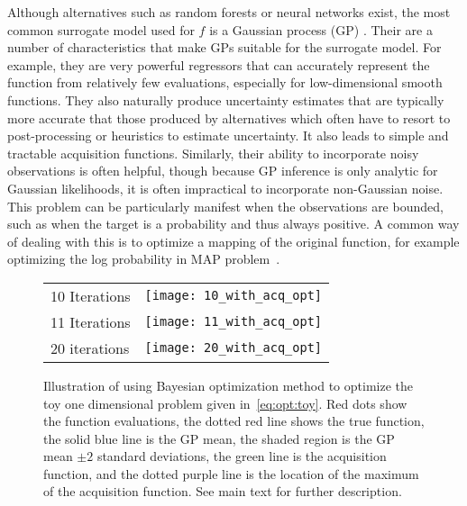 Although alternatives such as random forests \citep{bergstra2011algorithms,hutter2011sequential} 
or neural networks \citep{snoek2015scalable} exist, the most common surrogate model used for 
$f$ is a Gaussian process (GP) \citep{rasmussen2006gaussian}.  Their are a number
of characteristics that make GPs suitable for the surrogate model.  For example, they are very powerful
regressors that can accurately represent the function from relatively few evaluations, especially
for low-dimensional smooth functions.  They also naturally produce uncertainty estimates
that are typically more accurate that those produced by alternatives  which often
have to resort to post-processing or heuristics to estimate uncertainty.
It also leads to simple and tractable acquisition functions.  Similarly, their ability to incorporate
noisy observations is often helpful, though because GP inference is only analytic for Gaussian
likelihoods, it is often impractical to incorporate non-Gaussian noise.  This problem can be
particularly manifest when the observations are bounded, such as when the target is a probability
and thus always positive.  A common way of dealing with this is to optimize a mapping of the
original function, for example optimizing the log probability in MAP problem~\cite{osborne2010bayesian}.

\begin{figure}[p]
	\centering
	\begin{tabular}{m{} m{}}
		10 Iterations & \texttt{[image: 10\_with\_acq\_opt]}
		\\
		11 Iterations & \texttt{[image: 11\_with\_acq\_opt]}
		\\
		20 iterations & \texttt{[image: 20\_with\_acq\_opt]}
	\end{tabular}
	\caption{Illustration of using Bayesian optimization method to optimize the
		toy one dimensional problem given in~\eqref{eq:opt:toy}.  Red dots show
		the function evaluations,  the dotted red line shows the true function, 
		the solid blue line is the GP mean, the shaded region is the GP mean $\pm 2$
		standard deviations, the green line is the acquisition function, and
		the dotted purple line is the location of the maximum of the acquisition
		function. See main text for further description.\label{fig:opt:bayes-opt}}
\end{figure}

